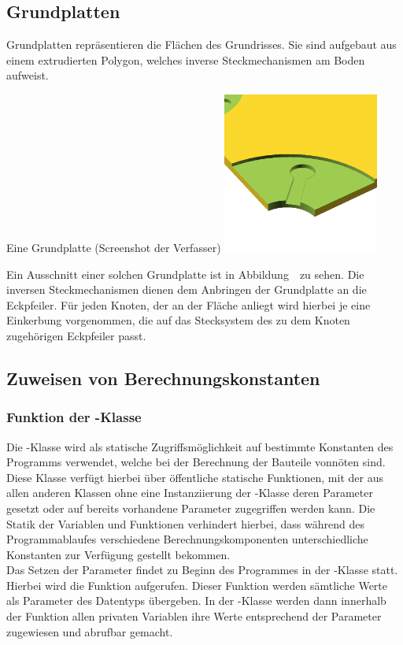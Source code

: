 \subsection{Grundplatten}
Grundplatten repräsentieren die Flächen des Grundrisses.
Sie sind aufgebaut aus einem extrudierten Polygon, welches inverse Steckmechanismen am Boden aufweist.
\begin{Bild}{Eine Grundplatte (Screenshot der Verfasser)}
	\includegraphics[height=200px]{Bilder/Untereinheit_GP}
\end{Bild}
Ein Ausschnitt einer solchen Grundplatte ist in Abbildung~\thebildnr\ zu sehen.
Die inversen Steckmechanismen dienen dem Anbringen der Grundplatte an die Eckpfeiler.
Für jeden Knoten, der an der Fläche anliegt wird hierbei je eine Einkerbung vorgenommen, die auf das Stecksystem des zu dem Knoten zugehörigen Eckpfeiler passt.

\subsection{Zuweisen von Berechnungskonstanten}
\label{params}
\subsubsection{Funktion der -Klasse}
Die -Klasse wird als statische Zugriffsmöglichkeit auf bestimmte Konstanten des Programms verwendet, welche bei der Berechnung der Bauteile vonnöten sind.
Diese Klasse verfügt hierbei über öffentliche statische Funktionen, mit der aus allen anderen Klassen ohne eine Instanziierung der -Klasse deren Parameter gesetzt oder auf bereits vorhandene Parameter zugegriffen werden kann.
Die Statik der Variablen und Funktionen verhindert hierbei, dass während des Programmablaufes verschiedene  Berechnungskomponenten unterschiedliche Konstanten zur Verfügung gestellt bekommen. \\
Das Setzen der Parameter findet zu Beginn des Programmes in der -Klasse statt.
Hierbei wird die Funktion  aufgerufen.
Dieser Funktion werden sämtliche Werte als Parameter des Datentyps  übergeben.
In der -Klasse werden dann innerhalb der Funktion allen privaten Variablen ihre Werte entsprechend der Parameter zugewiesen und abrufbar gemacht.\\

